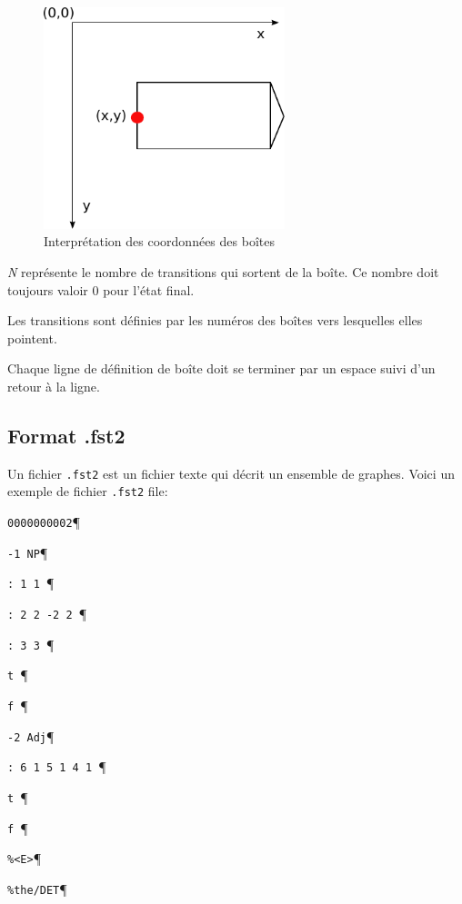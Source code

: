 \begin{figure}[!ht]
\begin{center}
\includegraphics[width=7cm]{resources/img/repere.pdf}
\caption{Interprétation des coordonnées des boîtes\label{fig-box-coordinates}}
\end{center}
\end{figure}

\bigskip
\noindent \textit{N} représente le nombre de transitions qui sortent de la boîte. Ce nombre doit
toujours valoir $0$ pour l’état final.

\bigskip
\noindent Les transitions sont définies par les numéros des boîtes vers lesquelles elles pointent.

\bigskip
\noindent Chaque ligne de définition de boîte doit se terminer par un espace suivi d’un retour à la
ligne.

\subsection{Format .fst2}
Un fichier \verb+.fst2+ est un fichier texte qui décrit un ensemble de graphes. Voici un exemple
de fichier \verb+.fst2+ file:

\bigskip
\verb+0000000002+\P

\verb+-1 NP+\P

\verb+: 1 1 +\P

\verb+: 2 2 -2 2 +\P

\verb+: 3 3 +\P

\verb+t +\P

\verb+f +\P

\verb+-2 Adj+\P

\verb+: 6 1 5 1 4 1 +\P

\verb+t +\P

\verb+f +\P

\verb+%<E>+\P

\verb+%the/DET+\P

